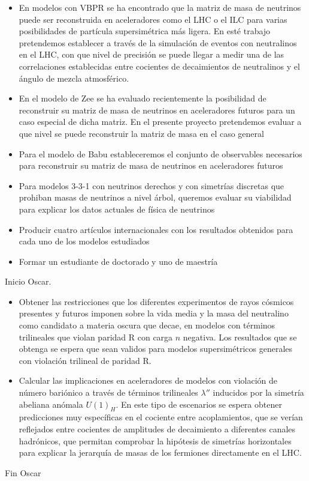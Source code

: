 \begin{itemize}
\item En modelos con VBPR se ha encontrado que la matriz de masa de
  neutrinos puede ser reconstruida en aceleradores como el LHC o el
  ILC para varias posibilidades de partícula supersimétrica más
  ligera. En esté trabajo pretendemos establecer a través de la
  simulación de eventos con neutralinos en el LHC, con que nivel de
  precisión se puede llegar a medir una de las correlaciones
  establecidas entre cocientes de decaimientos de neutralinos y el
  ángulo de mezcla atmosférico.
\item En el modelo de Zee se ha evaluado recientemente la posibilidad
  de reconstruir su matriz de masa de neutrinos en aceleradores
  futuros para un caso especial de dicha matriz. En el presente
  proyecto pretendemos evaluar a que nivel se puede reconstruir la
  matriz de masa en el caso general
\item Para el modelo de Babu estableceremos el conjunto de observables
  necesarios para reconstruir su matriz de masa de neutrinos en
  aceleradores futuros
\item Para modelos 3-3-1 con neutrinos derechos y con simetrías
  discretas que prohiban masas de neutrinos a nivel árbol, queremos
  evaluar su viabilidad para explicar los datos actuales de
  física de neutrinos
\item Producir cuatro artículos internacionales con los resultados
  obtenidos para cada uno de los modelos estudiados
\item Formar un estudiante de doctorado y uno de maestría
\end{itemize}
Inicio Oscar.\\
\begin{itemize}
\item Obtener las restricciones que los diferentes experimentos de rayos cósmicos 
presentes y futuros imponen sobre la vida media y la masa del neutralino como 
candidato a materia oscura que decae, en modelos con términos trilineales 
que violan paridad R con carga $n$ negativa. Los resultados que se obtenga se 
espera que sean validos para modelos supersimétricos generales con violación trilineal de paridad R.

\item Calcular las implicaciones en aceleradores de modelos con violación 
de número bariónico a través de términos trilineales $\lambda''$ inducidos por la simetría 
abeliana anómala $U(1)_H$. En este tipo de escenarios se espera obtener 
predicciones muy específicas en el cociente entre acoplamientos, que se verían reflejados entre 
cocientes de amplitudes de decaimiento a diferentes canales hadrónicos, que permitan comprobar 
la hipótesis de simetrías horizontales para explicar la jerarquía de masas de los fermiones directamente en el LHC. 
\end{itemize}
Fin Oscar


